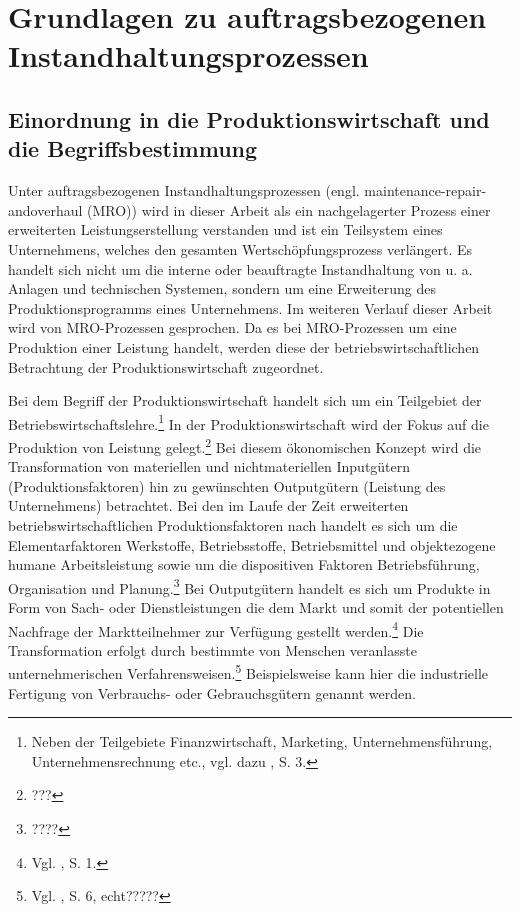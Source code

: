 \chapter{Grundlagen zu auftragsbezogenen Instandhaltungsprozessen}
\setcounter{footnote}{4}  %

\section{Einordnung in die Produktionswirtschaft und die Begriffsbestimmung}

Unter auftragsbezogenen Instandhaltungsprozessen (engl. maintenance-repair-and\-overhaul (MRO)) wird in dieser Arbeit als ein nachgelagerter Prozess einer erweiterten Leistungserstellung verstanden und ist ein Teilsystem eines Unternehmens, welches den gesamten Wertschöpfungsprozess verlängert. Es handelt sich nicht um die interne oder beauftragte Instandhaltung von u. a. Anlagen und technischen Systemen, sondern um eine Erweiterung des Produktionsprogramms eines Unternehmens. Im weiteren Verlauf dieser Arbeit wird von MRO-Prozessen gesprochen. Da es bei MRO-Prozessen um eine Produktion einer Leistung handelt, werden diese der betriebswirtschaftlichen Betrachtung der Produktionswirtschaft zugeordnet.

Bei dem Begriff der Produktionswirtschaft handelt sich um ein Teilgebiet der Betriebswirtschaftslehre.\footnote{Neben der Teilgebiete Finanzwirtschaft, Marketing, Unternehmensführung, Unternehmensrechnung etc., vgl. dazu \cite{Dyckhoff2010}, S. 3.} In der Produktionswirtschaft wird der Fokus auf die Produktion von Leistung gelegt.\footnote{???} Bei diesem ökonomischen Konzept wird die Transformation von materiellen und nichtmateriellen Inputgütern (Produktionsfaktoren) hin zu gewünschten Outputgütern (Leistung des Unternehmens) betrachtet. Bei den im Laufe der Zeit erweiterten betriebswirtschaftlichen Produktionsfaktoren nach \citet[S. 71]{Gutenberg:1959aa} handelt es sich um die Elementarfaktoren Werkstoffe, Betriebsstoffe, Betriebsmittel und objektezogene humane Arbeitsleistung sowie um die dispositiven Faktoren Betriebsführung, Organisation und Planung.\footnote{????} Bei Outputgütern handelt es sich um Produkte in Form von Sach- oder Dienstleistungen die dem Markt und somit der potentiellen Nachfrage der Marktteilnehmer zur Verfügung gestellt werden.\footnote{Vgl. \cite{Schmidt:2012aa}, S. 1.} Die Transformation erfolgt durch bestimmte von Menschen veranlasste unternehmerischen Verfahrensweisen.\footnote{Vgl. \cite{tempelmeier1994produktion}, S. 6, echt?????} Beispielsweise kann hier die industrielle Fertigung von Verbrauchs- oder Gebrauchsgütern genannt werden.

